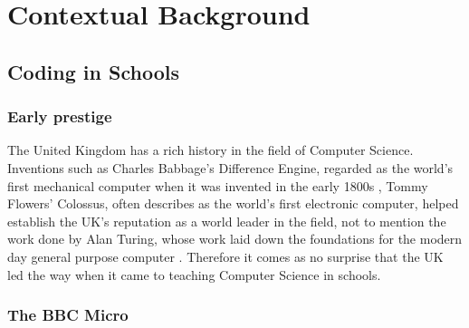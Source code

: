 \documentclass[ %
                    author={Jonathan Rankin},
                supervisor={Dr. David May, Dr. Ian Holyer},
                    degree={MEng},
                     title={CodeTouch},
                  subtitle={A Revolutionary Way To Program Real Code On Touch Screen Devices},
                      type={enterprise},
                      year={2015 } ]{dissertation}
\begin{document}
%

\mainmatter


\chapter{Contextual Background}
\label{chap:context}

\section{Coding in Schools}

\subsection{Early prestige}

The United Kingdom has a rich history in the field of Computer Science. Inventions such as Charles Babbage's Difference Engine, regarded as the world's first mechanical computer when it was invented in the early 1800s \cite{Swade}, Tommy Flowers' Colossus, often describes as the world's first electronic computer, \cite{mackintosh2008first} helped establish the UK's reputation as a world leader in the field, not to mention the work done by Alan Turing, whose work laid down the foundations for the modern day general purpose computer \cite{Newman253}. Therefore it comes as no surprise that the UK led the way when it came to teaching Computer Science in schools. 

\subsection{The BBC Micro}\label{sssec:bbcMicro}
\end{document}
